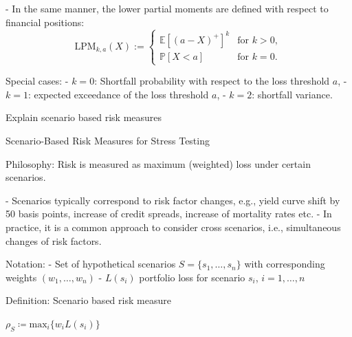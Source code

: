 - In the same manner, the lower partial moments are defined with respect to financial positions:
\[
\text{LPM}_{k,a}(X) :=
\begin{cases} 
\mathbb{E}[(a - X)^+]^k & \text{for } k > 0, \\
\mathbb{P}[X < a] & \text{for } k = 0.
\end{cases}
\]

Special cases:
- \( k = 0 \): Shortfall probability with respect to the loss threshold \( a \),
- \( k = 1 \): expected exceedance of the loss threshold \( a \),
- \( k = 2 \): shortfall variance.


Explain scenario based risk measures

Scenario-Based Risk Measures for Stress Testing

Philosophy: Risk is measured as maximum (weighted) loss under certain scenarios.

- Scenarios typically correspond to risk factor changes, e.g., 
  yield curve shift by 50 basis points, increase of credit spreads, increase of mortality rates etc.
- In practice, it is a common approach to consider cross scenarios, i.e., simultaneous changes of risk factors.

Notation:
- Set of hypothetical scenarios \( S = \{s_1, \ldots, s_n\} \) with corresponding weights \((w_1, \ldots, w_n)\)
- \( L(s_i) \) portfolio loss for scenario \( s_i \), \( i = 1, \dots, n\)

Definition: Scenario based risk measure

\( \rho_S \coloneqq \text{max}_{i} \{w_i L(s_i)\}\)

